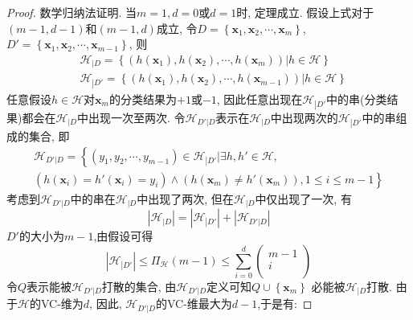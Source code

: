 \begin{proof}
数学归纳法证明. 当$m=1,d=0$或$d=1$时, 定理成立. 假设上式对于$(m-1,d-1)$和$(m-1,d)$成立, 令$D=\left\{\mathbf{x}_1,\mathbf{x}_2,\cdots, \mathbf{x}_m\right\}$, $D'=\left\{\mathbf{x}_1,\mathbf{x}_2,\cdots, \mathbf{x}_{m-1}\right\}$, 则
\begin{eqnarray}
&\mathcal{H}_{\left| D \right.}=\left\{ \left( h\left( \mathbf{x}_1 \right) ,h\left( \mathbf{x}_2 \right) ,\cdots ,h\left( \mathbf{x}_m \right) \right) \left| h\in \mathcal{H} \right. \right\} \\
& \mathcal{H}_{\left| D' \right.}=\left\{ \left( h\left( \mathbf{x}_1 \right) ,h\left( \mathbf{x}_2 \right) ,\cdots ,h\left( \mathbf{x}_{m-1} \right) \right) \left| h\in \mathcal{H} \right. \right\}
\end{eqnarray}
任意假设$h\in\mathcal{H}$对$\mathbf{x}_m$的分类结果为$+1$或$-1$, 因此任意出现在$\mathcal{H}_{\left| D' \right.}$中的串(分类结果)都会在$\mathcal{H}_{\left| D \right.}$中出现一次至两次. 令$\mathcal{H}_{D'\left| D \right.}$表示在$\mathcal{H}_{\left| D \right.}$中出现两次的$\mathcal{H}_{\left| D' \right.}$中的串组成的集合, 即
\begin{eqnarray}
 \nonumber
\mathcal{H}_{D'\left| D \right.}=\left\{ \left( y_1,y_2,\cdots ,y_{m-1} \right) \in \mathcal{H}_{\left| D' \right.}\left| \exists h,h'\in \mathcal{H}, \right. \right.\\
\left. \left( h\left( \mathbf{x}_i \right) =h'\left( \mathbf{x}_i \right) =y_i \right) \land \left( h\left( \mathbf{x}_m \right) \ne h'\left( \mathbf{x}_m \right) \right) ,1\le i\le m-1 \right\}
\end{eqnarray}
考虑到$\mathcal{H}_{D'\left| D \right.}$中的串在$\mathcal{H}_{\left| D \right.}$中出现了两次, 但在$\mathcal{H}_{\left| D \right.}$中仅出现了一次, 有
\begin{equation}
\left| \mathcal{H}_{\left| D \right.} \right|=\left| \mathcal{H}_{\left| D' \right.} \right|+\left| \mathcal{H}_{D'\left| D \right.} \right|
\end{equation}
$D'$的大小为$m-1$,由假设可得
\begin{equation}
\left| \mathcal{H}_{\left| D' \right.} \right|\le \Pi _{\mathcal{H}}\left( m-1 \right) \le \sum_{i=0}^d{\left( \begin{array}{c}
	m-1\\
	i\\
\end{array} \right)}
\end{equation}
令$Q$表示能被$\mathcal{H}_{D'\left| D \right.} $打散的集合, 由$\mathcal{H}_{D'\left| D \right.} $定义可知$Q\cup \left\{ \mathbf{x}_m \right\} $ 必能被$\mathcal{H}_{\left| D \right.} $打散. 由于$\mathcal{H}$的VC-维为$d$, 因此, $\mathcal{H}_{D'\left| D \right.} $的VC-维最大为$d-1$,于是有:

\end{proof}
